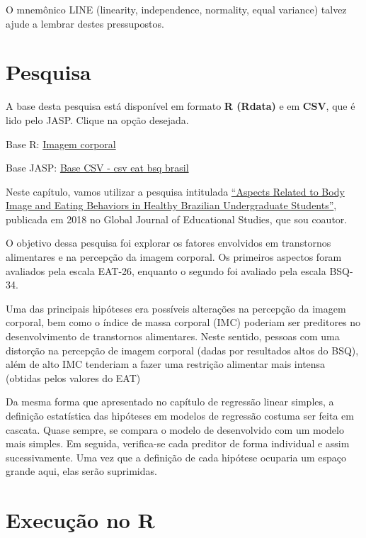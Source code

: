 \documentclass[
]{book}
\begin{document}
O mnemônico LINE (linearity, independence, normality, equal variance) talvez ajude a lembrar destes pressupostos.

\hypertarget{pesquisa-10}{%
\section{Pesquisa}\label{pesquisa-10}}

A base desta pesquisa está disponível em formato \textbf{R (Rdata)} e em \textbf{CSV}, que é lido pelo JASP. Clique na opção desejada.

Base R: \href{https://github.com/anovabr/mqt/raw/master/bases/Base\%20R\%20-\%20imagem\%20corporal.RData}{Imagem corporal}

Base JASP: \href{https://github.com/anovabr/mqt/raw/master/bases/bases_csv_jasp.zip}{Base CSV - csv eat bsq brasil}

Neste capítulo, vamos utilizar a pesquisa intitulada \href{https://www.researchgate.net/publication/323729370_Aspects_Related_to_Body_Image_and_Eating_Behaviors_in_Healthy_Brazilian_Undergraduate_Students}{``Aspects Related to Body Image and Eating Behaviors in Healthy Brazilian Undergraduate Students''}, publicada em 2018 no Global Journal of Educational Studies, que sou coautor.

O objetivo dessa pesquisa foi explorar os fatores envolvidos em transtornos alimentares e na percepção da imagem corporal. Os primeiros aspectos foram avaliados pela escala EAT-26, enquanto o segundo foi avaliado pela escala BSQ-34.

Uma das principais hipóteses era possíveis alterações na percepção da imagem corporal, bem como o índice de massa corporal (IMC) poderiam ser preditores no desenvolvimento de transtornos alimentares. Neste sentido, pessoas com uma distorção na percepção de imagem corporal (dadas por resultados altos do BSQ), além de alto IMC tenderiam a fazer uma restrição alimentar mais intensa (obtidas pelos valores do EAT)

Da mesma forma que apresentado no capítulo de regressão linear simples, a definição estatística das hipóteses em modelos de regressão costuma ser feita em cascata. Quase sempre, se compara o modelo de desenvolvido com um modelo mais simples. Em seguida, verifica-se cada preditor de forma individual e assim sucessivamente. Uma vez que a definição de cada hipótese ocuparia um espaço grande aqui, elas serão suprimidas.

\hypertarget{execuuxe7uxe3o-no-r-15}{%
\section{Execução no R}\label{execuuxe7uxe3o-no-r-15}}
\end{document}
